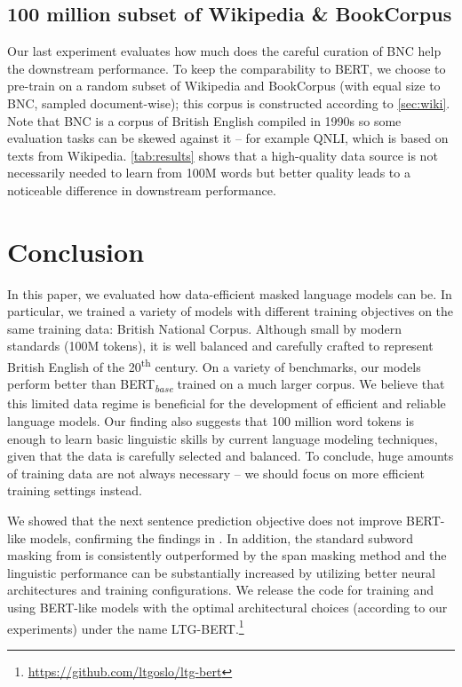     \subsection{100 million subset of Wikipedia \& BookCorpus}
    \label{sec:wiki-subset-eval}
    
    Our last experiment evaluates how much does the careful curation of BNC help the downstream performance. To keep the comparability to BERT, we choose to pre-train on a random subset of Wikipedia and BookCorpus (with equal size to BNC, sampled document-wise); this corpus is constructed according to \cref{sec:wiki}. Note that BNC is a corpus of British English compiled in 1990s so some evaluation tasks can be skewed against it -- for example QNLI, which is based on texts from Wikipedia. \cref{tab:results} shows that a high-quality data source is not necessarily needed to learn from 100M words but better quality leads to a noticeable difference in downstream performance.
    
    
    

\section{Conclusion}
In this paper, we evaluated how data-efficient masked language models can be. In particular, we trained a variety of models with different training objectives on the same training data: British National Corpus. Although small by modern standards (100M tokens), it is well balanced and carefully crafted to represent British English of the 20\textsuperscript{th} century. On a variety of benchmarks, our models perform better than BERT\textsubscript{\textit{base}} trained on a much larger corpus. We believe that this limited data regime is beneficial for the development of efficient and reliable language models. Our finding also suggests that 100 million word tokens is enough to learn basic linguistic skills by current language modeling techniques, given that the data is carefully selected and balanced. To conclude, huge amounts of training data are not always necessary -- we should focus on more efficient training settings instead.

We showed that the next sentence prediction objective does not improve BERT-like models, confirming the findings in . In addition, the standard subword masking from  is consistently outperformed by the span masking method and the linguistic performance can be substantially increased by utilizing better neural architectures and training configurations. We release the code for training and using BERT-like models with the optimal architectural choices (according to our experiments) under the name LTG-BERT.\footnote{\url{https://github.com/ltgoslo/ltg-bert}}
    
